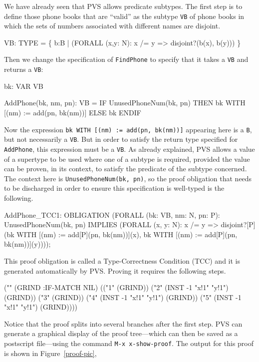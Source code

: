 We have already seen that PVS allows predicate subtypes.  The first
step is to define those phone books that are ``valid'' as the subtype {\tt VB}
of phone books in which the sets of numbers associated with different
names are disjoint.
\begin{jmrsession}
  VB: TYPE = \{ b:B | (FORALL (x,y: N): x /= y => disjoint?(b(x), b(y))) \}
\end{jmrsession}
Then we change the specification of {\tt FindPhone} to specify that it takes
a {\tt VB} and returns a {\tt VB}:
\begin{jmrsession}
  bk: VAR VB

  AddPhone(bk, nm, pn): VB = 
    IF UnusedPhoneNum(bk, pn) THEN bk WITH [(nm) := add(pn, bk(nm))]
      ELSE bk
    ENDIF
\end{jmrsession}
Now the expression {\tt bk WITH [(nm) := add(pn, bk(nm))]} appearing
here is a {\tt B}, but not necessarily a {\tt VB}.  But in order to
satisfy the return type specified for {\tt AddPhone}, this expression
must be a {\tt VB}\@.  As already explained, PVS allows a value of a
supertype to be used where one of a subtype is required, provided the
value can be proven, in its context, to satisfy the predicate of the
subtype concerned.  The context here is {\tt UnusedPhoneNum(bk, pn)},
so the proof obligation that needs to be discharged in order to ensure
this specification is well-typed is the following.
\begin{jmrsession}

AddPhone_TCC1: OBLIGATION
      (FORALL (bk: VB, nm: N, pn: P):
         UnusedPhoneNum(bk, pn) IMPLIES
           (FORALL (x, y: N): 
              x /= y =>
                disjoint?[P](bk WITH [(nm) := add[P](pn, bk(nm))](x),
                             bk WITH [(nm) := add[P](pn, bk(nm))](y))));
\end{jmrsession}
This proof obligation is called a Type-Correctness Condition (TCC) and
it is generated automatically by PVS\@.  
Proving it requires the following steps.
\begin{jmrsession}
("" (GRIND :IF-MATCH NIL)
    (("1" (GRIND)) ("2" (INST -1 "x!1" "y!1")
                        (GRIND))
                   ("3" (GRIND))
                   ("4" (INST -1 "x!1" "y!1")
                        (GRIND))
                   ("5" (INST -1 "x!1" "y!1")
                        (GRIND))))
\end{jmrsession}
Notice that the proof splits into several branches after the first
step.  PVS can generate a graphical display of the proof tree---which
can then be saved as a postscript file---using the command {\tt M-x
x-show-proof}.  The output for this proof is shown in
Figure~\ref{proof-pic},

